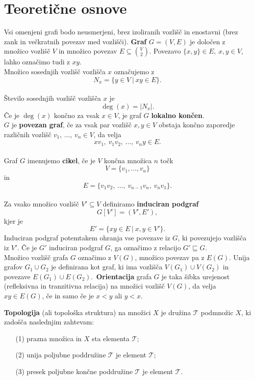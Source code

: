 \documentclass[a4paper, 12pt]{book}
\theoremstyle{definition}
\theoremstyle{remark}
\begin{document}
\section{Teoretične osnove}
Vsi omenjeni grafi bodo neusmerjeni, brez izoliranih vozlišč in enostavni (brez zank
in večkratnih povezav med vozlišči).
\textbf{Graf} $G = (V,E)$ je določen z množico vozlišč $V$ in množico povezav $E \subseteq \binom{V}{2}$.
Povezavo $\{x,y\} \in E,\ x,y \in V$, lahko označimo tudi z $xy$.\\
Množico sosednjih vozlišč vozlišča $x$ označujemo z \[N_x = \{y \in V\ |\ xy \in E\}.\]\\
Število sosednjih vozlišč vozlišča $x$ je \[\deg(x) = |N_x|.\] Če je $\deg(x)$ končno
za vsak $x \in V$, je graf $G$ \textbf{lokalno končen}.\\
$G$ je \textbf{povezan graf}, če za vsak par vozlišč $x,y \in V$ obstaja končno
zaporedje različnih vozlišč $v_1,\ \dots,\ v_n \in V$, da velja \[xv_1,\ v_1v_2,\ \dots,\ v_n y \in E.\]\\
Graf $G$ imenujemo \textbf{cikel}, če je $V$ končna množica $n$ točk \[V=\{v_1,\dots,v_n\}\] in
\[E=\{v_1 v_2,\ \dots,\ v_{n-1}v_n,\ v_n v_1\}.\] \\
Za vsako množico vozlišč $V' \subseteq V$ definiramo \textbf{induciran podgraf} \[G[V'] = (V',E'),\]
kjer je \[E' = \{xy \in E\ |\ x,y \in V'\}.\] Induciran podgraf potemtakem ohranja vse povezave
iz $G$, ki povezujejo vozlišča iz $V'$. Če je $G'$ induciran podgraf $G$,
ga označimo z relacijo $G' \sqsubseteq  G$.\\
Množico vozlišč grafa $G$ označimo z $V(G)$, množico povezav pa z $E(G)$. Unija
grafov $G_1 \cup G_2$ je definirana kot graf, ki ima vozlišča $V(G_1) \cup V(G_2)$
in povezave $E(G_1) \cup E(G_2)$.\
\textbf{Orientacija} grafa $G$ je taka šibka urejenost (refleksivna in tranzitivna relacija)
na množici vozlišč $V(G)$, da velja $xy \in E(G)$, če in samo če je $x < y$ ali $y < x$.\\\par
\textbf{Topologija} (ali topološka struktura) na množici $X$ je družina $\mathcal{T}$ podmnožic
$X$, ki zadošča naslednjim zahtevam:
\begin{itemize}
    \item[(1)] prazna množica in $X$ sta elementa $\mathcal{T}$;
    \item[(2)] unija poljubne poddružine $\mathcal{T}$ je element $\mathcal{T}$;
    \item[(3)] presek poljubne končne poddružine $\mathcal{T}$ je element $\mathcal{T}$.
\end{itemize}
\end{document}
